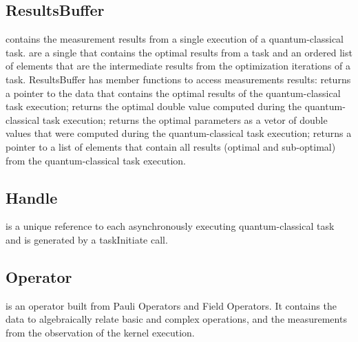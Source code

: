 \subsection{\textbf{ResultsBuffer}}\label{subsec:ResultsBuffer}
 contains the measurement results from a single execution of a quantum-classical task.  are a single  that contains the optimal results from a task and an ordered list of  elements that are the intermediate results from the optimization iterations of a task. ResultsBuffer has member functions to access measurements results:  returns a pointer to the  data that contains the optimal results of the quantum-classical task execution;  returns the optimal double value computed during the quantum-classical task execution;  returns the optimal parameters as a vetor of double values that were computed during the quantum-classical task execution;  returns a pointer to a list of  elements that contain all results (optimal and sub-optimal) from the quantum-classical task execution.\\

\subsection{\textbf{Handle}}\label{subsec:Handle}
 is a unique reference to each asynchronously executing quantum-classical task and is generated by a taskInitiate call. \\

\subsection{\textbf{Operator}}\label{subsec:Operator}
 is an operator built from Pauli Operators and Field Operators.
It contains the data to algebraically relate basic and complex operations, 
and the measurements from the observation of the kernel execution.\\

